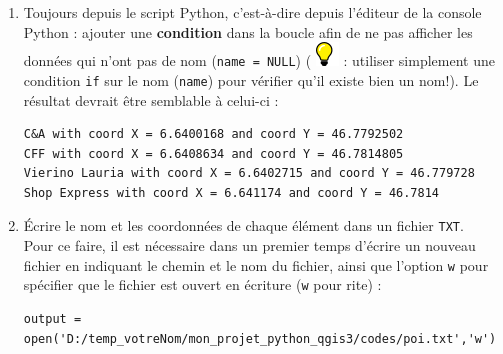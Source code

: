 \documentclass[11pt]{article}
\begin{document}
\begin{enumerate}
\item Toujours depuis le script Python, c'est-à-dire depuis l'éditeur de la console Python : ajouter une \textbf{condition} dans la boucle afin de ne pas afficher les données qui n'ont pas de nom (\texttt{name = NULL}) ( \includegraphics[scale=1]{tip_l.png} \underline{}: utiliser simplement une condition \og{} \texttt{if}\fg{} sur le nom (\texttt{name}) pour vérifier qu'il existe bien un nom!). Le résultat devrait être semblable à celui-ci : 
\vspace*{-1em}
\begin{center}
\begin{minipage}[t]{0.76\textwidth}
\begin{verbatim}
C&A with coord X = 6.6400168 and coord Y = 46.7792502
CFF with coord X = 6.6408634 and coord Y = 46.7814805
Vierino Lauria with coord X = 6.6402715 and coord Y = 46.779728
Shop Express with coord X = 6.641174 and coord Y = 46.7814
\end{verbatim}
\end{minipage}
\end{center}
\vspace*{1em}


\item Écrire le nom et les coordonnées de chaque élément dans un fichier \texttt{TXT}.\\

Pour ce faire, il est nécessaire dans un premier temps d'écrire un nouveau fichier en indiquant le chemin et le nom du fichier, ainsi que l'option \og{}\texttt{w}\fg{} pour spécifier que le fichier est ouvert en écriture (\texttt{w} pour \underline{}rite) : 
\vspace*{-1em}
\begin{center}
\begin{minipage}[t]{0.88\textwidth}
\begin{verbatim}
output = open('D:/temp_votreNom/mon_projet_python_qgis3/codes/poi.txt','w')
\end{verbatim}
\end{minipage}
\end{center}
\vspace*{1em}


\end{enumerate}
\end{document}
